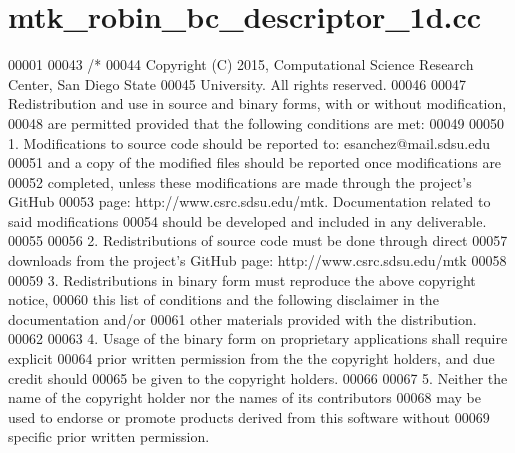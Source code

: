 \hypertarget{mtk__robin__bc__descriptor__1d_8cc_source}{\section{mtk\+\_\+robin\+\_\+bc\+\_\+descriptor\+\_\+1d.\+cc}
\label{mtk__robin__bc__descriptor__1d_8cc_source}
}

\begin{DoxyCode}
00001 
00043 \textcolor{comment}{/*}
00044 \textcolor{comment}{Copyright (C) 2015, Computational Science Research Center, San Diego State}
00045 \textcolor{comment}{University. All rights reserved.}
00046 \textcolor{comment}{}
00047 \textcolor{comment}{Redistribution and use in source and binary forms, with or without modification,}
00048 \textcolor{comment}{are permitted provided that the following conditions are met:}
00049 \textcolor{comment}{}
00050 \textcolor{comment}{1. Modifications to source code should be reported to: esanchez@mail.sdsu.edu}
00051 \textcolor{comment}{and a copy of the modified files should be reported once modifications are}
00052 \textcolor{comment}{completed, unless these modifications are made through the project's GitHub}
00053 \textcolor{comment}{page: http://www.csrc.sdsu.edu/mtk. Documentation related to said modifications}
00054 \textcolor{comment}{should be developed and included in any deliverable.}
00055 \textcolor{comment}{}
00056 \textcolor{comment}{2. Redistributions of source code must be done through direct}
00057 \textcolor{comment}{downloads from the project's GitHub page: http://www.csrc.sdsu.edu/mtk}
00058 \textcolor{comment}{}
00059 \textcolor{comment}{3. Redistributions in binary form must reproduce the above copyright notice,}
00060 \textcolor{comment}{this list of conditions and the following disclaimer in the documentation and/or}
00061 \textcolor{comment}{other materials provided with the distribution.}
00062 \textcolor{comment}{}
00063 \textcolor{comment}{4. Usage of the binary form on proprietary applications shall require explicit}
00064 \textcolor{comment}{prior written permission from the the copyright holders, and due credit should}
00065 \textcolor{comment}{be given to the copyright holders.}
00066 \textcolor{comment}{}
00067 \textcolor{comment}{5. Neither the name of the copyright holder nor the names of its contributors}
00068 \textcolor{comment}{may be used to endorse or promote products derived from this software without}
00069 \textcolor{comment}{specific prior written permission.}

\end{DoxyCode}
